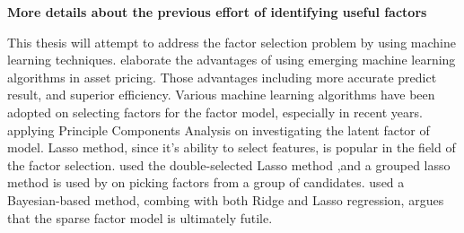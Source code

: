 {\bf More details about the previous effort of identifying useful factors }


This thesis will attempt to address the factor selection problem by using machine learning techniques.
 elaborate the advantages of using emerging machine learning algorithms in asset pricing.
Those advantages including more accurate predict result, and superior efficiency.
Various machine learning algorithms have been adopted on selecting factors for the factor model, especially in recent years.
 applying Principle Components Analysis on investigating the latent factor of model. 
Lasso method, since it's ability to select features, is popular in the field of the factor selection.
 used the double-selected Lasso method \cite{Belloni2014},and a grouped lasso method \cite{Huang2010} is used by  on picking factors from a group of candidates. 
 used a Bayesian-based method, combing with both Ridge and Lasso regression, argues that the sparse factor model is ultimately futile. 
